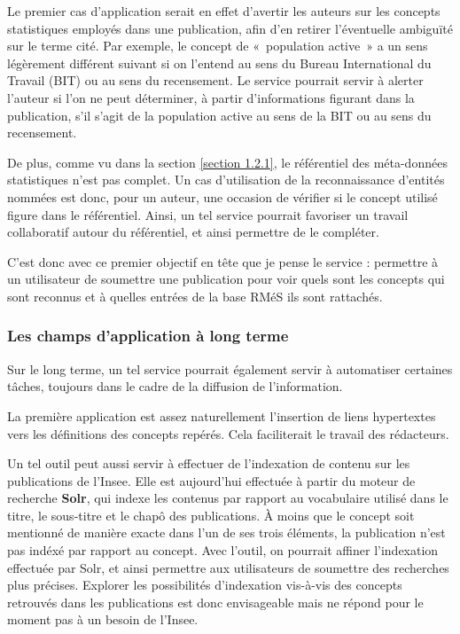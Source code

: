 Le premier cas d'application serait en effet d'avertir les auteurs sur les concepts statistiques employés dans une publication, afin d'en retirer l'éventuelle ambiguïté sur le terme cité. Par exemple, le concept de «~population active~» a un sens légèrement différent suivant si on l'entend au sens du Bureau International du Travail (BIT) ou au sens du recensement. Le service pourrait servir à alerter l'auteur si l'on ne peut déterminer, à partir d'informations figurant dans la publication, s'il s'agit de la population active au sens de la BIT ou au sens du recensement.
\newline

De plus, comme vu dans la section \ref{section 1.2.1}, le référentiel des méta-données statistiques n'est pas complet. Un cas d'utilisation de la reconnaissance d'entités nommées est donc, pour un auteur, une occasion de vérifier si le concept utilisé figure dans le référentiel. Ainsi, un tel service pourrait favoriser un travail collaboratif autour du référentiel, et ainsi permettre de le compléter.
\newline

C'est donc avec ce premier objectif en tête que je pense le service : permettre à un utilisateur de soumettre une publication pour voir quels sont les concepts qui sont reconnus et à quelles entrées de la base RMéS ils sont rattachés.
\label{section 2.1.3}

\subsubsection{Les champs d'application à long terme}
Sur le long terme, un tel service pourrait également servir à automatiser certaines tâches, toujours dans le cadre de la diffusion de l'information. 
\newline

La première application est assez naturellement l'insertion de liens hypertextes vers les définitions des concepts repérés. Cela faciliterait le travail des rédacteurs. 
\newline

Un tel outil peut aussi servir à effectuer de l'indexation de contenu sur les publications de l'Insee. Elle est aujourd'hui effectuée à partir du moteur de recherche \textbf{Solr}, qui indexe les contenus par rapport au vocabulaire utilisé dans le titre, le sous-titre et le chapô des publications. À moins que le concept soit mentionné de manière exacte dans l'un de ses trois éléments, la publication n'est pas indéxé par rapport au concept. Avec l'outil, on pourrait affiner l'indexation effectuée par Solr, et ainsi permettre aux utilisateurs de soumettre des recherches plus précises. Explorer les possibilités d'indexation vis-à-vis des concepts retrouvés dans les publications est donc envisageable mais ne répond pour le moment pas à un besoin de l'Insee.
\newline

